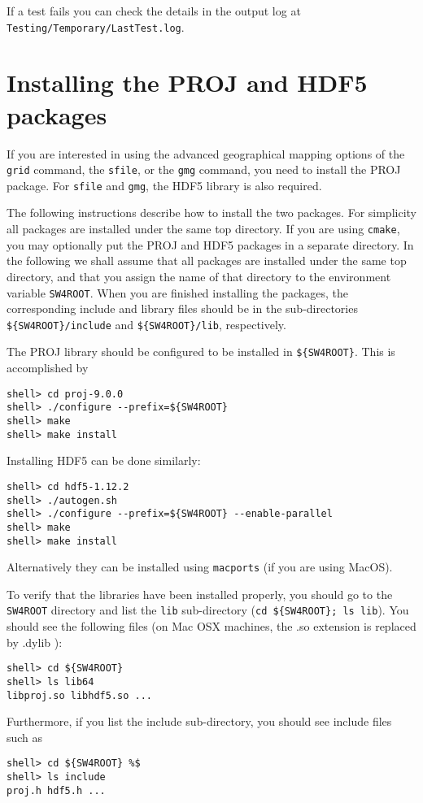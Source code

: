 \documentclass[11pt]{article}
\begin{document}
If a test fails you can check the details in the output log at
\texttt{Testing/Temporary/LastTest.log}.

\section{Installing the PROJ and HDF5 packages}\label{sec:proj}
 

If you are interested in using the advanced geographical mapping options of the {\tt grid} command, the {\tt sfile}, or the {\tt gmg} command, you need to install the PROJ package. For {\tt sfile} and {\tt gmg}, the HDF5 library is also required.

The following instructions describe how to install the two packages. For simplicity all packages
are installed under the same top directory. If you are using {\tt cmake}, you may optionally put the
PROJ and HDF5 packages in a separate directory. In the following we shall assume that all packages are
installed under the same top directory, and that you assign the name of that directory to the
environment variable \verb+SW4ROOT+. When you are finished installing the packages, the
corresponding include and library files should be in the sub-directories \verb+${SW4ROOT}/include+
and \verb+${SW4ROOT}/lib+, respectively.

The PROJ library should be configured to be installed in \verb+${SW4ROOT}+. This is accomplished by
\begin{verbatim}
shell> cd proj-9.0.0
shell> ./configure --prefix=${SW4ROOT}
shell> make
shell> make install
\end{verbatim}

Installing HDF5 can be done similarly:
\begin{verbatim}
shell> cd hdf5-1.12.2
shell> ./autogen.sh
shell> ./configure --prefix=${SW4ROOT} --enable-parallel
shell> make
shell> make install
\end{verbatim}

Alternatively they can be installed using {\tt macports} (if you are using MacOS).

To verify that the libraries have been installed properly, you should go to the \verb+SW4ROOT+
directory and list the {\tt lib} sub-directory (\verb+cd ${SW4ROOT}; ls lib+). You should see the
following files (on Mac OSX machines, the .so extension is replaced by .dylib ):
\begin{verbatim}
shell> cd ${SW4ROOT}
shell> ls lib64
libproj.so libhdf5.so ...
\end{verbatim}
Furthermore, if you list the include sub-directory, you should see include files such as 
\begin{verbatim}
shell> cd ${SW4ROOT} %$
shell> ls include
proj.h hdf5.h ...

\end{verbatim}
\end{document}
